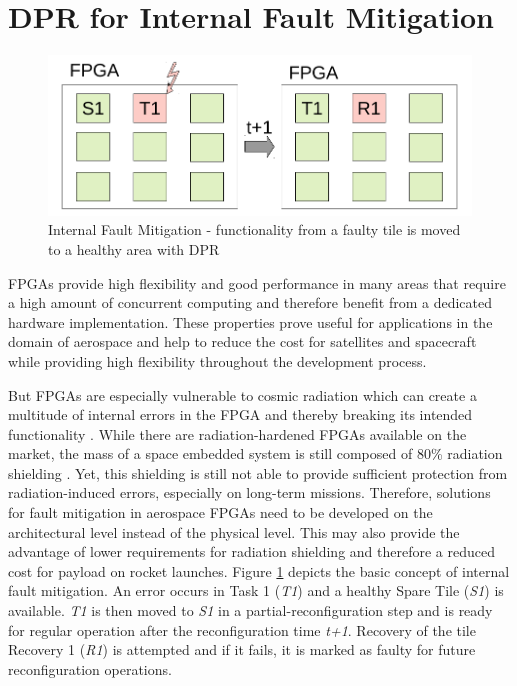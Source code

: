 \section{\gls{DPR} for Internal Fault Mitigation}\label{InternalFaults}
\begin{figure}
    \centering
    \includegraphics[width=\columnwidth]{graphics/faultyTile2.pdf}
    \caption{Internal Fault Mitigation - functionality from a faulty tile is moved to a healthy area with \gls{DPR}}\label{fig:internalFaultMitigation}
\end{figure}

%
\glspl{FPGA} provide high flexibility and good performance in many areas that require a high amount of concurrent computing and therefore benefit from a dedicated hardware implementation.
These properties prove useful for applications in the domain of aerospace and help to reduce the cost for satellites and spacecraft while providing high flexibility throughout the development process. 

But \glspl{FPGA} are especially vulnerable to cosmic radiation which can create a multitude of internal errors in the \gls{FPGA} and thereby breaking its intended functionality \cite{ito_total_2015}.
While there are radiation-hardened \glspl{FPGA} available on the market, the mass of a space embedded system is still composed of 80\% radiation shielding \cite{ito_total_2015}.
Yet, this shielding is still not able to provide sufficient protection from radiation-induced errors, especially on long-term missions. 
Therefore, solutions for fault mitigation in aerospace \glspl{FPGA} need to be developed on the architectural level instead of the physical level. 
This may also provide the advantage of lower requirements for radiation shielding and therefore a reduced cost for payload on rocket launches.
Figure \ref{fig:internalFaultMitigation} depicts the basic concept of internal fault mitigation. 
An error occurs in Task 1 (\textit{T1}) and a healthy Spare Tile (\textit{S1}) is available. 
\textit{T1} is then moved to \textit{S1} in a partial-reconfiguration step and is ready for regular operation after the reconfiguration time \textit{t+1}.
Recovery of the tile Recovery 1 (\textit{R1}) is attempted and if it fails, it is marked as faulty for future reconfiguration operations.

